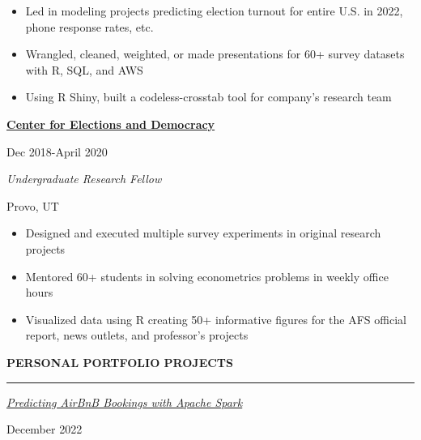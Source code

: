 \documentclass[
  16,
]{article}
\providecommand{\tightlist}{%
  \setlength{\itemsep}{0pt}\setlength{\parskip}{0pt}}\usepackage{longtable,booktabs,array}
\begin{document}
\begin{itemize}
\tightlist
\item
  Led in modeling projects predicting election turnout for entire U.S.
  in 2022, phone response rates, etc.
\item
  Wrangled, cleaned, weighted, or made presentations for 60+ survey
  datasets with R, SQL, and AWS
\item
  Using R Shiny, built a codeless-crosstab tool for company's research
  team
\end{itemize}

\vspace{7pt}

\begin{large}
  \begin{multicols}{2}
    \begin{flushleft}{\bf \href{http://csed.byu.edu/}{Center for Elections and Democracy}}\end{flushleft}
    \begin{flushright}Dec 2018-April 2020\end{flushright}
  \end{multicols}
  \vspace{-0.17cm}
  \begin{multicols}{2}
    \begin{flushleft}\textit{Undergraduate Research Fellow}\end{flushleft}
    \begin{flushright}Provo, UT\end{flushright}
  \end{multicols}
\end{large}
\vspace{-0.16cm}

\begin{itemize}
\tightlist
\item
  Designed and executed multiple survey experiments in original research
  projects
\item
  Mentored 60+ students in solving econometrics problems in weekly
  office hours
\item
  Visualized data using R creating 50+ informative figures for the AFS
  official report, news outlets, and professor's projects
\end{itemize}

\vspace{7pt}

\begin{large}
  {\bf PERSONAL PORTFOLIO PROJECTS}
  \vspace{3pt}
  \hrule
  \begin{multicols}{2}
    \begin{flushleft}\textit{\href{https://github.com/acbass49/predicting_bookings}{Predicting AirBnB Bookings with Apache Spark}}\end{flushleft}
    \begin{flushright}December 2022\end{flushright}
  \end{multicols}
  \vspace{-0.17cm}
\end{large}
\end{document}
